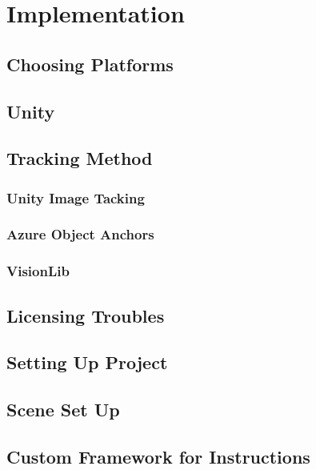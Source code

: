 \documentclass{l4proj}
\begin{document}
\chapter{Implementation}

\section{Choosing Platforms}

\section{Unity}

\section{Tracking Method}

\subsection{Unity Image Tacking}

\subsection{Azure Object Anchors}

\subsection{VisionLib}

\section{Licensing Troubles}

\section{Setting Up Project}
\section{Scene Set Up}

\section{Custom Framework for Instructions}
\end{document}
